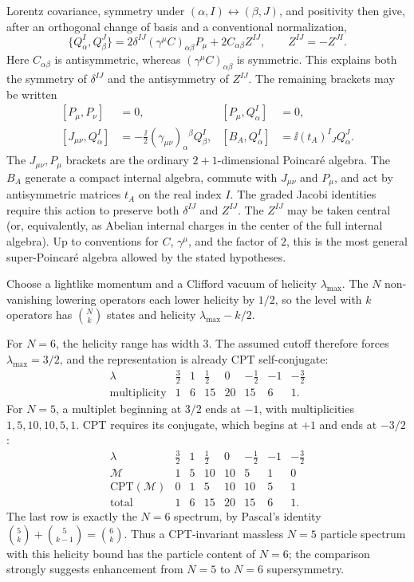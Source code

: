 \begin{enumerate}
  Lorentz covariance, symmetry under
  \((\alpha,I)\leftrightarrow(\beta,J)\), and positivity then give, after
  an orthogonal change of basis and a conventional normalization,
  \[
    \{Q^I_\alpha,Q^J_\beta\}
      =2\delta^{IJ}(\gamma^\mu C)_{\alpha\beta}P_\mu
       +2C_{\alpha\beta}Z^{IJ},
    \qquad Z^{IJ}=-Z^{JI}.
  \]
  Here \(C_{\alpha\beta}\) is antisymmetric, whereas
  \((\gamma^\mu C)_{\alpha\beta}\) is symmetric.  This explains both the
  symmetry of \(\delta^{IJ}\) and the antisymmetry of \(Z^{IJ}\).  The
  remaining brackets may be written
  \[
  \begin{aligned}
    [P_\mu,P_\nu]&=0,&
    [P_\mu,Q^I_\alpha]&=0,\\
    [J_{\mu\nu},Q^I_\alpha]
      &=-\frac{\ii}{2}(\gamma_{\mu\nu})_\alpha{}^\beta Q^I_\beta,&
    [B_A,Q^I_\alpha]&=\ii(t_A)^I{}_JQ^J_\alpha .
  \end{aligned}
  \]
  The \(J_{\mu\nu},P_\mu\) brackets are the ordinary \(2+1\)-dimensional
  Poincar\'e algebra.  The \(B_A\) generate a compact internal algebra,
  commute with \(J_{\mu\nu}\) and \(P_\mu\), and act by antisymmetric
  matrices \(t_A\) on the real index \(I\).  The graded Jacobi identities
  require this action to preserve both \(\delta^{IJ}\) and \(Z^{IJ}\).
  The \(Z^{IJ}\) may be taken central (or, equivalently, as Abelian internal
  charges in the center of the full internal algebra).  Up to conventions
  for \(C\), \(\gamma^\mu\), and the factor of \(2\), this is the most
  general super-Poincar\'e algebra allowed by the stated hypotheses.

  Choose a lightlike momentum and a Clifford vacuum of helicity
  \(\lambda_{\max}\).  The \(N\) non-vanishing lowering operators each lower
  helicity by \(1/2\), so the level with \(k\) operators has
  \(\binom Nk\) states and helicity \(\lambda_{\max}-k/2\).

  For \(N=6\), the helicity range has width \(3\).  The assumed cutoff
  therefore forces \(\lambda_{\max}=3/2\), and the representation is already
  CPT self-conjugate:
  \[
  \begin{array}{c|rrrrrrr}
    \lambda&\frac32&1&\frac12&0&-\frac12&-1&-\frac32\\ \hline
    \text{multiplicity}&1&6&15&20&15&6&1 .
  \end{array}
  \]
  For \(N=5\), a multiplet beginning at \(3/2\) ends at \(-1\), with
  multiplicities \(1,5,10,10,5,1\).  CPT requires its conjugate, which
  begins at \(+1\) and ends at \(-3/2\):
  \[
  \begin{array}{c|rrrrrrr}
    \lambda&\frac32&1&\frac12&0&-\frac12&-1&-\frac32\\ \hline
    \mathcal M&1&5&10&10&5&1&0\\
    \text{CPT}(\mathcal M)&0&1&5&10&10&5&1\\ \hline
    \text{total}&1&6&15&20&15&6&1 .
  \end{array}
  \]
  The last row is exactly the \(N=6\) spectrum, by Pascal's identity
  \(\binom5k+\binom5{k-1}=\binom6k\).  Thus a CPT-invariant massless
  \(N=5\) particle spectrum with this helicity bound has the particle
  content of \(N=6\); the comparison strongly suggests enhancement from
  \(N=5\) to \(N=6\) supersymmetry.


\end{enumerate}
